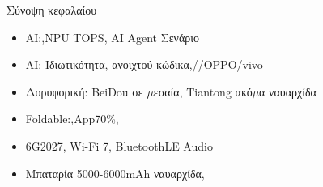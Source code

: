 \begin{tcbsummary}{Σύνοψη κεφαλαίου}
\begin{itemize}
  \item AI:,NPU TOPS, AI Agent Σενάριο
  \item AI: Ιδιωτικότητα, ανοιχτού κώδικα,//OPPO/vivo
  \item Δορυφορική: BeiDou σε $\mu$εσαία, Tiantong ακό$\mu$α ναυαρχίδα
  \item Foldable:,App70\%,
  \item 6G2027, Wi-Fi 7, BluetoothLE Audio
  \item Μπαταρία 5000-6000mAh ναυαρχίδα,
\end{itemize}

\end{tcbsummary}
